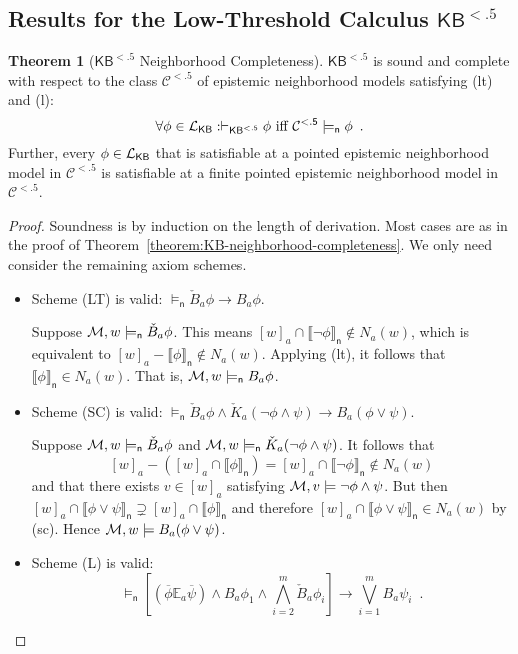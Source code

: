 \documentclass[12pt]{article}
\theoremstyle{definition}
\newtheorem{theorem}{Theorem}[section]
\newcommand{\M}{{\cal M}}      %
\newcommand{\Lang}{{\cal L}}   %
\newcommand{\KB}{{\mathsf{KB}}}                     %
\newcommand{\KBlt}{{\mathsf{KB}^{\mathsf{<.5}}}}    %
\newcommand{\Clt}{{\mathcal{C}^{\mathsf{<.5}}}}    %
\newcommand{\modelsn}{\models_{\mathsf{n}}}                  %
\newcommand{\semn}[1]{\llbracket{#1}\rrbracket_{\mathsf{n}}} %
\begin{document}
\subsection{Results for the Low-Threshold Calculus $\KBlt$}

\begin{theorem}[$\KBlt$ Neighborhood Completeness]
  \label{theorem:KBlt-neighborhood-completeness}
  $\KBlt$ is sound and complete with respect to the class $\Clt$ of
  epistemic neighborhood models satisfying (lt) and (l):
  \[
  \forall\phi\in\Lang_\KB: \vdash_\KBlt\phi \text{ iff }
  \Clt\modelsn\phi \enspace.
  \]
  Further, every $\phi\in\Lang_\KB$ that is satisfiable at a pointed
  epistemic neighborhood model in $\Clt$ is satisfiable at a finite
  pointed epistemic neighborhood model in $\Clt$.
\end{theorem}
\begin{proof}
  Soundness is by induction on the length of derivation.  Most cases
  are as in the proof of
  Theorem~\ref{theorem:KB-neighborhood-completeness}.  We only need
  consider the remaining axiom schemes.
  \begin{itemize}
  \item Scheme (LT) is valid: $\modelsn \check B_a\phi\to B_a\phi$.

    Suppose $\M,w\modelsn\check B_a\phi$.  This means
    $[w]_a\cap\semn{\lnot\phi}\notin N_a(w)$, which is equivalent to
    $[w]_a-\semn{\phi}\notin N_a(w)$.  Applying (lt), it follows that
    $\semn{\phi}\in N_a(w)$.  That is, $\M,w\modelsn B_a\phi$.

  \item Scheme (SC) is valid: $\modelsn \check B_a\phi \land \check
    K_a(\lnot\phi\land\psi) \to B_a(\phi\lor\psi)$.

    Suppose $\M,w\modelsn\check B_a\phi$ and $\M,w\modelsn \check
    K_a(\lnot\phi\land\psi)$.  It follows that
    \[
    [w]_a-([w]_a\cap\semn{\phi})=[w]_a\cap\semn{\lnot\phi}\notin
    N_a(w)
    \]
    and that there exists $v\in[w]_a$ satisfying
    $\M,v\models\lnot\phi\land\psi$.  But then
    $[w]_a\cap\semn{\phi\lor\psi}\supsetneq[w]_a\cap\semn{\phi}$ and
    therefore $[w]_a\cap\semn{\phi\lor\psi}\in N_a(w)$ by (sc). Hence
    $\M,w\models B_a(\phi\lor\psi)$.

  \item Scheme (L) is valid:
    \[
    \modelsn \textstyle [(\overline\phi\mathbb{E}_a\overline\psi)
    \land B_a\phi_1 \land \bigwedge_{i=2}^m \check B_a\phi_i] \to
    \bigvee_{i=1}^m B_a\psi_i\enspace.
    \]


\end{itemize}
\end{proof}
\end{document}
